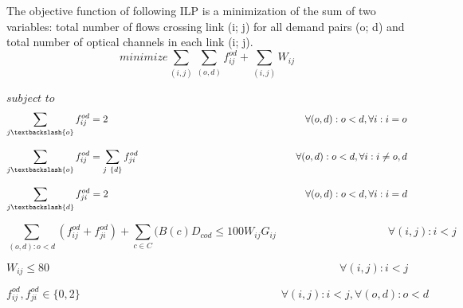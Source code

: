 \vspace{20pt}

The objective function of following ILP is a minimization of the sum of two variables: total number of flows crossing link (i; j) for all demand pairs (o; d) and total number of optical channels in each link (i; j).
\newpage
\begin{equation}
minimize    \sum_{(i,j)} \sum_{(o,d)} f_{ij}^{od} + \sum_{(i,j)} W_{ij}
\label{ILPOpaque}
\end{equation}

$subject$ $to$
\begin{equation}
\sum_{j\textbackslash \{o\}} f_{ij}^{od} = 2  \qquad \qquad \qquad \qquad \qquad \qquad \qquad \qquad \qquad \qquad
\forall(o,d) : o < d, \forall i: i = o
\label{ILPOpaque1}
\end{equation}

\vspace{-5pt}
\begin{equation}
\sum_{j\textbackslash \{o\}} f_{ij}^{od} = \sum_{j\ \{d\}} f_{ji}^{od}   \qquad \qquad \qquad \qquad \qquad \qquad \qquad \qquad
\forall(o,d) : o < d, \forall i: i \neq o,d
\label{ILPOpaque2}
\end{equation}

\vspace{-5pt}
\begin{equation}
\sum_{j\textbackslash \{d\}} f_{ji}^{od} = 2  \qquad \qquad \qquad \qquad \qquad \qquad \qquad \qquad \qquad \qquad
\forall(o,d) : o < d, \forall i: i = d
\label{ILPOpaque3}
\end{equation}

\vspace{-5pt}
\begin{equation}
\sum_{(o,d):o<d} \left(f_{ij}^{od} + f_{ji}^{od}\right) + \sum_{c\in C} (B\left(c\right) D_{cod}\leq100 W_{ij} G_{ij} \qquad \qquad \qquad \qquad \qquad
\forall(i,j) : i < j
\label{ILPOpaque4}
\end{equation}

\vspace{-5pt}
\begin{equation}
W_{ij} \leq 80 \qquad  \qquad \qquad \qquad \qquad \qquad \qquad \qquad \qquad \qquad \qquad \qquad \qquad \forall(i,j) : i < j
\label{ILPOpaque5}
\end{equation}

\vspace{-5pt}
\begin{equation}
f_{ij}^{od} , f_{ji}^{od} \in \{0,2\}   \qquad \qquad \qquad \qquad \qquad \qquad \qquad \qquad \qquad
\forall(i,j) : i < j, \forall(o,d) : o < d
\label{ILPOpaque6}
\end{equation}

